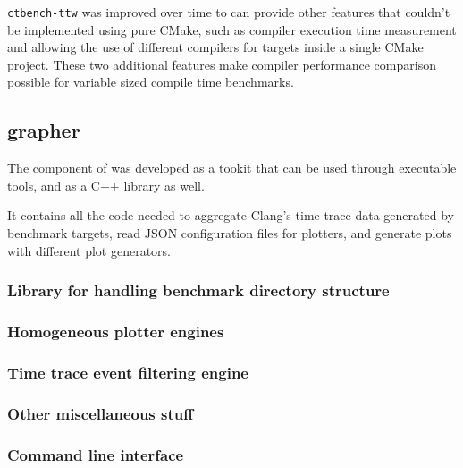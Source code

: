\documentclass[../../main.tex]{subfiles}
\begin{document}
\lstinline{ctbench-ttw} was improved over time to can provide other features
that couldn't be implemented using pure CMake, such as compiler execution time
measurement and allowing the use of different compilers for targets inside a
single CMake project. These two additional features make compiler performance
comparison possible for variable sized compile time benchmarks.

\subsection{grapher} \label{lbl:grapher}

The \grapher component of \ctbench was developed as a tookit that can be used
through executable tools, and as a C++ library as well.

It contains all the code needed to aggregate Clang's time-trace data generated
by \ctbench benchmark targets, read JSON configuration files for plotters, and
generate plots with different plot generators.

\subsubsection{Library for handling benchmark directory structure}


\subsubsection{Homogeneous plotter engines}



\subsubsection{Time trace event filtering engine}


\subsubsection{Other miscellaneous stuff}


\subsubsection{Command line interface}
\end{document}
